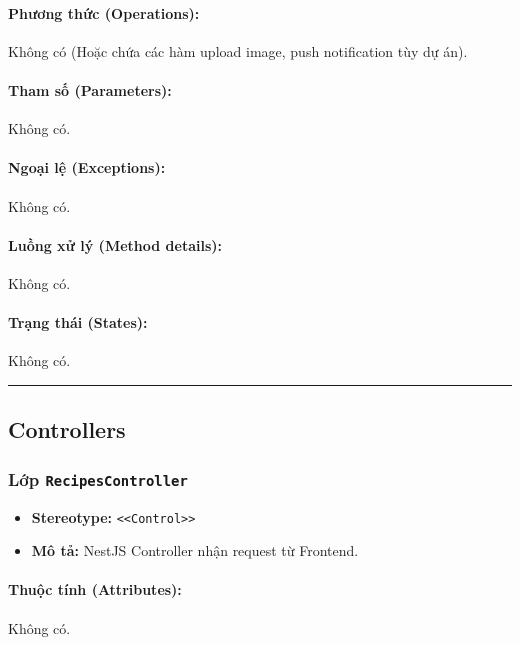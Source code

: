 \documentclass[12pt,a4paper]{article}
\begin{document}
\paragraph{Phương thức (Operations):}
Không có (Hoặc chứa các hàm upload image, push notification tùy dự án).

\paragraph{Tham số (Parameters):}
Không có.

\paragraph{Ngoại lệ (Exceptions):}
Không có.

\paragraph{Luồng xử lý (Method details):}
Không có.

\paragraph{Trạng thái (States):}
Không có.

\vskip 0.5cm
\noindent\rule{\textwidth}{0.5pt}
\vskip 0.5cm

\subsection{Controllers}


\subsubsection{Lớp \texttt{RecipesController}}

\begin{itemize}[leftmargin=*]
    \item \textbf{Stereotype:} \texttt{\textless{}\textless{}Control\textgreater{}\textgreater{}}
    \item \textbf{Mô tả:} NestJS Controller nhận request từ Frontend.
\end{itemize}

\paragraph{Thuộc tính (Attributes):}
Không có.
\end{document}
